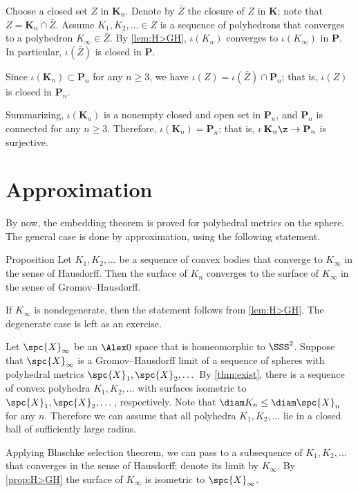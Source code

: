 Choose a closed set $Z$ in $\mathbf{K}_n$.
Denote by $\bar Z$ the closure of $Z$ in $\mathbf{K}$; note that $Z=\mathbf{K}_n\cap \bar Z$.
Assume $K_1,K_2,\dots\in Z$ is a sequence of polyhedrons that converges to a polyhedron $K_\infty\in\bar Z$.
By \ref{lem:H>GH}, $\iota(K_n)$ converges to $\iota(K_\infty)$ in $\mathbf{P}$.
In particular, $\iota(\bar Z)$ is closed in $\mathbf{P}$.

Since $\iota(\mathbf{K}_n)\subset \mathbf{P}_n$ for any $n\ge 3$, we have $\iota (Z)=\iota(\bar Z)\cap \mathbf{P}_n$;
that is, $\iota (Z)$ is closed in $\mathbf{P}_n$.

\medskip

Summarizing, $\iota(\mathbf{K}_n)$ is a nonempty closed and open set in $\mathbf{P}_n$, and $\mathbf{P}_n$ is connected for any $n\ge 3$.
Therefore, $\iota(\mathbf{K}_n)=\mathbf{P}_n$; that is, $\iota\:\mathbf{K}_n\z\to\mathbf{P}_n$ is surjective.
\qeds

\section{Approximation}

By now, the embedding theorem is proved for polyhedral metrics on the sphere.
The general case is done by approximation, using the following statement.

\begin{thm}{Proposition}\label{prop:H>GH}
Let $K_1,K_2,\dots$ be a sequence of convex bodies that converge to $K_\infty$ in the sense of Hausdorff.
Then the surface of $K_n$ converges to the surface of $K_\infty$ in the sense of Gromov--Hausdorff.
\end{thm}

If $K_\infty$ is nondegenerate, then the statement follows from \ref{lem:H>GH}.
The degenerate case is left as an exercise.

Let $\spc{X}_\infty$ be an $\Alex0$ space that is homeomorphic to $\SSS^2$.
Suppose that $\spc{X}_\infty$ is a Gromov--Hausdorff limit of a sequence of spheres with polyhedral metrics $\spc{X}_1,\spc{X}_2,\dots$
By \ref{thm:exist}, there is a sequence of convex polyhedra $K_1,K_2,\dots$ with surfaces isometric to $\spc{X}_1,\spc{X}_2,\dots$, respectively.
Note that  $\diam K_n\le \diam \spc{X}_n$ for any $n$.
Therefore we can assume that all polyhedra $K_1,K_2,\dots$ lie in a closed ball of sufficiently large radius.

Applying Blaschke selection theorem, we can pass to a subsequence of $K_1,K_2,\dots$ that converges in the sense of Hausdorff; denote its limit by $K_\infty$.
By \ref{prop:H>GH} the surface of $K_\infty$ is isometric to $\spc{X}_\infty$.

